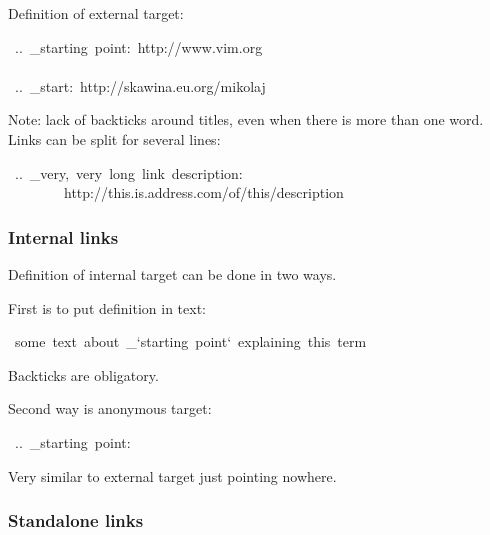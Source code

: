 \documentclass[12pt]{article}
\begin{document}
Definition of external target:

\begin{ttfamily}\begin{flushleft}
\mbox{~..~\_starting~point:~http://www.vim.org}\\
\mbox{}\\
\mbox{~..~\_start:~http://skawina.eu.org/mikolaj}\\
\end{flushleft}\end{ttfamily}

Note: lack of backticks around titles, even when there is more than one
word. Links can be split for several lines:

\begin{ttfamily}\begin{flushleft}
\mbox{~..~\_very,~very~long~link~description:}\\
\mbox{~~~~~~~~http://this.is.address.com/of/this/description}\\
\end{flushleft}\end{ttfamily}

\hypertarget{linternal-links}{}
\subsubsection{Internal links}

Definition of internal target can be done in two ways.

First is to put definition in text:

\begin{ttfamily}\begin{flushleft}
\mbox{~some~text~about~\_`starting~point`~explaining~this~term}\\
\end{flushleft}\end{ttfamily}

Backticks are obligatory.

Second way is anonymous target:

\begin{ttfamily}\begin{flushleft}
\mbox{~..~\_starting~point:}\\
\end{flushleft}\end{ttfamily}

Very similar to external target just pointing nowhere.

\hypertarget{lstandalone-links}{}
\subsubsection{Standalone links}
\end{document}
